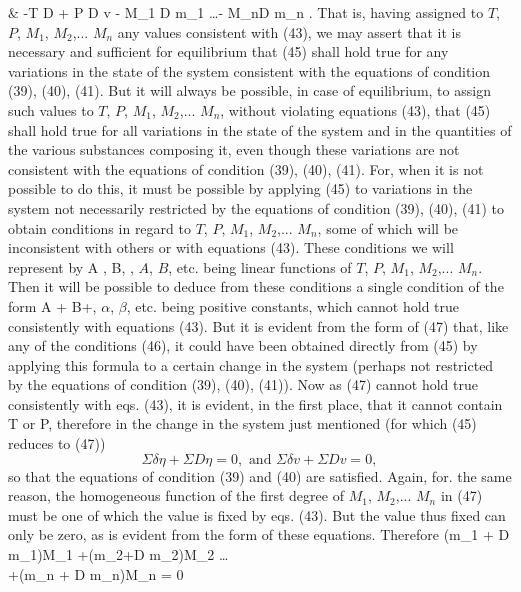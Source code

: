 \documentclass[12pt]{article}
\begin{document}
& -T \Sigma D \eta + P \Sigma D v - M_1 \Sigma D m_1 \dots - M_n\Sigma D m_n .  \label{45}\eqe
That is, having assigned to $T$, $P$, $M_1$, $M_2$,... $M_n$ any values consistent with (43), we may assert that it is necessary and sufficient for equilibrium that (45) shall hold true for any variations in the state of the system consistent with the equations of condition (39), (40),
(41). But it will always be possible, in case of equilibrium, to assign such values to $T$, $P$, $M_1$, $M_2$,... $M_n$, without violating equations (43), that (45) shall hold true for all variations in the state of the system and in the quantities of the various substances composing it, even though these variations are not consistent with the equations of condition (39), (40), (41). For, when it is not possible to do this, it must be possible by applying (45) to variations in the system not necessarily restricted by the equations of condition (39), (40), (41) to obtain conditions in regard to $T$, $P$, $M_1$, $M_2$,... $M_n$, some of which will be inconsistent with others or with equations (43). These conditions we will represent by
\eqs A ,\text{ } B, ,                  \label{46}\eqe
$A$, $B$, etc. being linear functions of $T$, $P$, $M_1$, $M_2$,... $M_n$. Then it will be possible to deduce from these conditions a single condition of the form
\eqs \alpha A + \beta B+,                 \label{47}\eqe
$\alpha$, $\beta$, etc. being positive constants, which cannot hold true consistently with equations (43). But it is evident from the form of (47) that, like any of the conditions (46), it could have been obtained directly from (45) by applying this formula to a certain change in the system (perhaps not restricted by the equations of condition (39), (40), (41)). Now as (47) cannot hold true consistently with eqs. (43), it is evident, in the first place, that it cannot contain T or P, therefore in the change in the system just mentioned (for which (45) reduces to (47))
$$\Sigma \delta \eta + \Sigma D \eta = 0, \text{     and     } \Sigma \delta v + \Sigma D v = 0,$$
so that the equations of condition (39) and (40) are satisfied. Again, for. the same reason, the homogeneous function of the first degree of $M_1$, $M_2$,... $M_n$ in (47) must be one of which the value is fixed by eqs. (43). But the value thus fixed can only be zero, as is evident from the form of these equations. Therefore
\eqs 
(\Sigma \delta m_1 + \Sigma D m_1)M_1 +(\Sigma \delta m_2+\Sigma D m_2)M_2 \dots\\
+(\Sigma \delta m_n + \Sigma D m_n)M_n = 0  \label{48}
\end{document}
